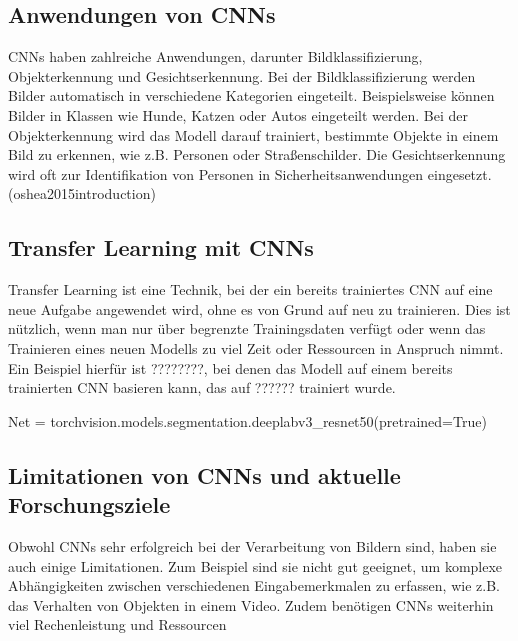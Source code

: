     
    \subsection{Anwendungen von CNNs}
    
        CNNs haben zahlreiche Anwendungen, darunter Bildklassifizierung, Objekterkennung und Gesichtserkennung.      
        Bei der Bildklassifizierung werden Bilder automatisch in verschiedene Kategorien eingeteilt.      
        Beispielsweise können Bilder in Klassen wie Hunde, Katzen oder Autos eingeteilt werden.  
        Bei der Objekterkennung wird das Modell darauf trainiert, bestimmte Objekte in einem Bild zu erkennen, wie z.B.      Personen oder Straßenschilder.      
        Die Gesichtserkennung wird oft zur Identifikation von Personen in Sicherheitsanwendungen eingesetzt.
        \footfullcite(oshea2015introduction)
    \subsection{Transfer Learning mit CNNs}
    
        Transfer Learning ist eine Technik, bei der ein bereits trainiertes CNN auf eine neue Aufgabe angewendet wird, ohne es von Grund auf neu zu trainieren.      
        Dies ist nützlich, wenn man nur über begrenzte Trainingsdaten verfügt oder wenn das Trainieren eines neuen Modells zu viel Zeit oder Ressourcen in Anspruch nimmt.      
        Ein Beispiel hierfür ist ????????, bei denen das Modell auf einem bereits trainierten CNN basieren kann, das auf ?????? trainiert wurde.

        Net = torchvision.models.segmentation.deeplabv3_resnet50(pretrained=True)
        
    \subsection{Limitationen von CNNs und aktuelle Forschungsziele}

        Obwohl CNNs sehr erfolgreich bei der Verarbeitung von Bildern sind, haben sie auch einige Limitationen.      
        Zum Beispiel sind sie nicht gut geeignet, um komplexe Abhängigkeiten zwischen verschiedenen Eingabemerkmalen zu erfassen, wie z.B. das Verhalten von Objekten in einem Video.
        Zudem benötigen CNNs weiterhin viel Rechenleistung und Ressourcen

